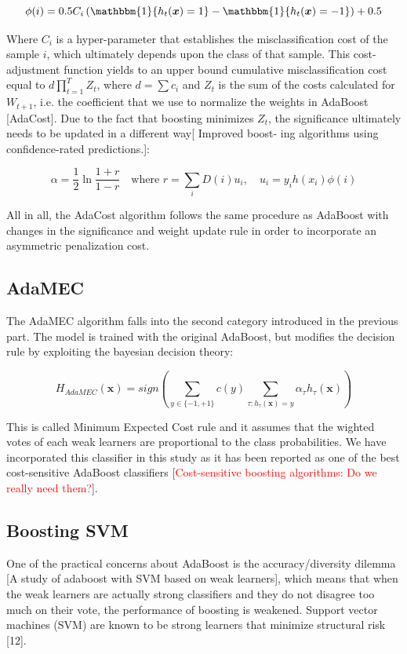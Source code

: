 \documentclass[conference]{IEEEtran}
\begin{document}
$$\phi(i) = 0.5C_i \left( \mathbbm{1}\{ h_t(\boldsymbol x)=1\} -  \mathbbm{1}\{ h_t(\boldsymbol x)=-1\} \right)+0.5$$

Where $C_i$ is a hyper-parameter that establishes the misclassification cost of the sample $i$, which ultimately depends upon the class of that sample. This cost-adjustment function yields to an upper bound cumulative misclassification cost equal to $d\prod_{t=1}^TZ_t$, where $d= \sum c_i$ and $Z_t$ is the sum of the costs calculated for $W_{t+1}$, i.e. the coefficient that we use to normalize the weights in AdaBoost [AdaCost]. Due to the fact that boosting minimizes $Z_t$, the significance ultimately needs to be updated in a different way[ Improved boost- ing algorithms using confidence-rated predictions.]:

$$ \alpha = \frac{1}{2}\ln\frac{1+r}{1-r}\quad \text{where } r=\sum_iD(i)u_i, \quad u_i=y_i h(x_i)\phi(i)$$

All in all, the AdaCost algorithm follows the same procedure as AdaBoost with changes in the significance and weight update rule in order to incorporate an asymmetric penalization cost. 

\subsection{AdaMEC}
The AdaMEC algorithm falls into the second category introduced in the previous part. The model is trained with the original AdaBoost, but modifies the decision rule by exploiting the bayesian decision theory:

$$ H_{AdaMEC}(\boldsymbol x) = sign \left( \sum_{y \in \{-1,+1\}} c(y) \sum_{\tau: h_{\tau}(\boldsymbol x)=y} \alpha_{\tau} h_{\tau}(\boldsymbol x)\right)$$

This is called Minimum Expected Cost rule and it assumes that the wighted votes of each weak learners are proportional to the class probabilities. We have incorporated this classifier in this study as it has been reported as one of the best cost-sensitive AdaBoost classifiers [\textcolor{red}{Cost-sensitive boosting algorithms: Do we really need them?}].


\subsection{Boosting SVM}
One of the practical concerns about AdaBoost is the accuracy/diversity dilemma [A study of adaboost with SVM based on weak learners], which means that when the weak learners are actually strong classifiers and they do not disagree too much on their vote, the performance of boosting is weakened. Support vector machines (SVM) are known to be strong learners that minimize structural risk [12]. 
\end{document}
